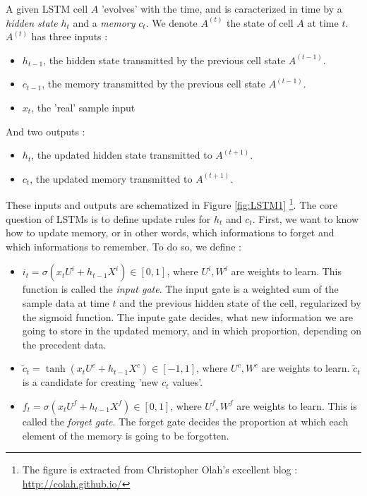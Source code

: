 \documentclass{article}
\begin{document}
\noindent A given LSTM cell $A$ 'evolves' with the time, and is caracterized in time 
by a \textit{hidden state} $h_t$ and a \textit{memory} $c_t$. We denote $A^{(t)}$ the state of cell
$A$ at time $t$. $A^{(t)}$   has three inputs : 
\begin{itemize}
    \item $h_{t-1}$, the hidden state transmitted by the previous cell state $A^{(t-1)}$. 
    \item $c_{t-1}$, the memory transmitted by the previous cell state $A^{(t-1)}$.
    \item $x_t$, the 'real' sample input
\end{itemize}
And two outputs : 
\begin{itemize}
    \item $h_{t}$, the updated hidden state transmitted to  $A^{(t+1)}$. 
    \item $c_{t}$, the updated memory transmitted to  $A^{(t+1)}$.
\end{itemize}
These inputs and outputs are schematized in Figure \ref{fig:LSTM1} \footnote{The figure is extracted from Christopher Olah's excellent blog : \href{http://colah.github.io/posts/2015-08-Understanding-LSTMs/}{http://colah.github.io/}}. 
The core question of LSTMs is to define update rules for $h_t$ and $c_t$. First, we want to 
know how to update memory, or in other words, which informations to forget and which informations
to remember. To do so, we define :
\begin{itemize}
    \item $i_t = \sigma\left ( x_t U^i + h_{t-1} X^{i}\right) \in [0, 1]$, where $U^i, W^i$ are weights to learn.
         This function is called the \textit{input gate}. The input gate is a weighted sum of
         the sample data at time $t$ and the previous hidden state of the cell, regularized by the sigmoid function.
         The inpute gate decides, what new information we are going to store in the updated memory, and in
         which proportion, depending on the precedent data. 
    \item $\tilde{c}_t = \tanh \left ( x_t U^c + h_{t-1} X^{c}\right ) \in [-1, 1] $, where $U^c, W^c$ are weights to learn.
    $\tilde{c}_t$ is a candidate for creating 'new $c_{t}$ values'.
    \item $f_t = \sigma \left (x_t U^f + h_{t-1} X^{f}\right ) \in [0,1]$, where $U^f, W^f$ are weights to learn.
    This is called the \textit{forget gate}. The forget gate decides the proportion at which each element of the 
    memory is going to be forgotten.
\end{itemize}
\end{document}
